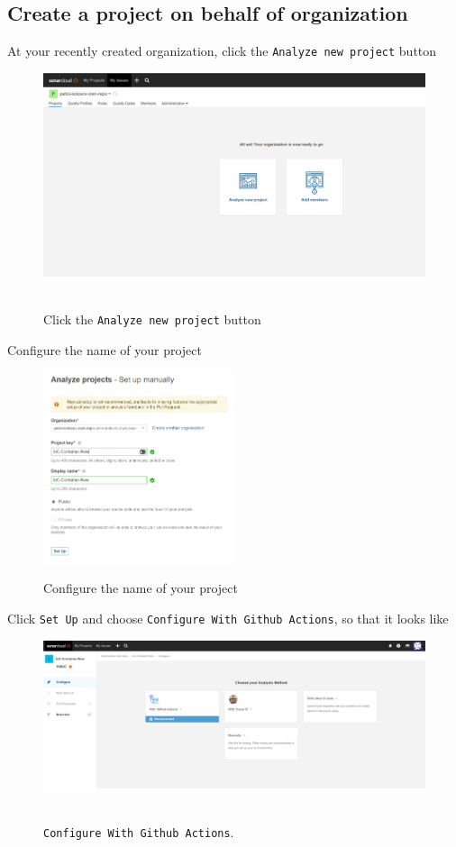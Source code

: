 \subsection{Create a project on behalf of organization}\label{subsec:create-a-project-on-behalf-of-organization}
At your recently created organization, click the \texttt{Analyze new project} button
\begin{figure}[H]
    \centering
    \includegraphics[width=1\textwidth]{img/05_organization_main_page}
    ~\caption{Click the \texttt{Analyze new project} button}\label{fig:figure5}
\end{figure}
Configure the name of your project
\begin{figure}[H]
    \centering
    \includegraphics[width=0.5\textwidth]{img/06_configure_project_name}
    ~\caption{Configure the name of your project}\label{fig:figure6}
\end{figure}
Click \texttt{Set Up} and choose \texttt{Configure With Github Actions}, so that it looks like
\begin{figure}[H]
    \centering
    \includegraphics[width=1\textwidth]{img/07_configure_with_ghactions}
    ~\caption{\texttt{Configure With Github Actions}.}\label{fig:figure7}
\end{figure}
